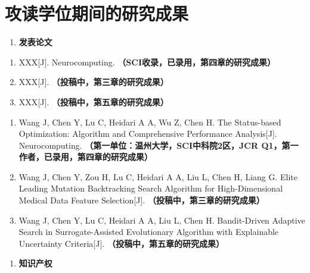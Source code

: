 \documentclass{wzuthesis} %
\def\blind{}       %
\begin{document}
    \newpage
\fi
\chapter{攻读学位期间的研究成果}

\begin{enumerate}[label=\arabic*.]
    \item \textbf{发表论文}
\end{enumerate}

\ifdefined\blind  %
    \begin{enumerate}
        \renewcommand{\labelenumi}{[\arabic{enumi}]}
        \setlength{\itemindent}{0em}
        \setlength{\labelsep}{0.5em}

        \item XXX[J]. Neurocomputing. \textbf{（SCI收录，已录用，第四章的研究成果）}
        \item XXX[J]. \textbf{（投稿中，第三章的研究成果）}
        \item XXX[J]. \textbf{（投稿中，第五章的研究成果）}
    \end{enumerate}
\else
    \begin{enumerate}
        \renewcommand{\labelenumi}{[\arabic{enumi}]}
        \setlength{\itemindent}{0em}
        \setlength{\labelsep}{0.5em}

        \item Wang J, Chen Y, Lu C, Heidari A A, Wu Z, Chen H. The Status-based Optimization: Algorithm and Comprehensive Performance Analysis[J]. Neurocomputing. \textbf{（第一单位：温州大学，SCI中科院2区，JCR Q1，第一作者，已录用，第四章的研究成果）}
        \item Wang J, Chen Y, Zou H, Lu C, Heidari A A, Liu L, Chen H, Liang G. Elite Leading Mutation Backtracking Search Algorithm for High-Dimensional Medical Data Feature Selection[J]. \textbf{（投稿中，第三章的研究成果）}
        \item Wang J, Chen Y, Lu C, Heidari A A, Liu L, Chen H. Bandit-Driven Adaptive Search in Surrogate-Assisted Evolutionary Algorithm with Explainable Uncertainty Criteria[J]. \textbf{（投稿中，第五章的研究成果）}
    \end{enumerate}
\fi

\ifdefined\blind
\else
    \begin{enumerate}[label=\arabic*., start=2]
        \item \textbf{知识产权}
    \end{enumerate}
\end{document}
